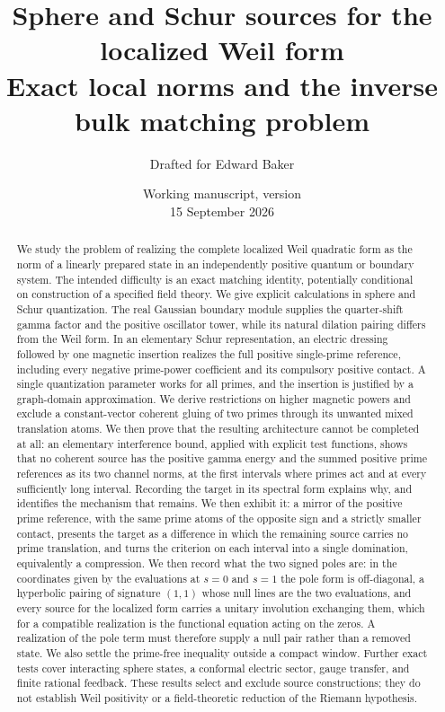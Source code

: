 \documentclass[11pt]{article}
\title{Sphere and Schur sources for the localized Weil form\\[5pt]
\large Exact local norms and the inverse bulk matching problem}
\author{Drafted for Edward Baker}
\date{Working manuscript, version \draftversion\\15 September 2026}
\numberwithin{equation}{section}
\theoremstyle{definition}
\theoremstyle{remark}
\begin{document}
\maketitle
\begin{abstract}
We study the problem of realizing the complete localized Weil quadratic
form as the norm of a linearly prepared state in an independently positive
quantum or boundary system. The intended difficulty is an exact matching
identity, potentially conditional on construction of a specified field
theory. We give explicit calculations in sphere and Schur quantization.
The real Gaussian boundary module supplies the quarter-shift gamma factor
and the positive oscillator tower, while its natural dilation pairing
differs from the Weil form. In an elementary Schur representation, an
electric dressing followed by one magnetic insertion realizes the full
positive single-prime reference, including every negative prime-power
coefficient and its compulsory positive contact. A single quantization
parameter works for all primes, and the insertion is justified by a
graph-domain approximation. We derive restrictions on higher magnetic
powers and exclude a constant-vector coherent gluing of two primes through
its unwanted mixed translation atoms. We then prove that the resulting
architecture cannot be completed at all: an elementary interference bound,
applied with explicit test functions, shows that no coherent source has the
positive gamma energy and the summed positive prime references as its two
channel norms, at the first intervals where primes act and at every
sufficiently long interval. Recording the target in its spectral form
explains why, and identifies the mechanism that remains. We then exhibit it:
a mirror of the positive prime reference, with the same prime atoms of the
opposite sign and a strictly smaller contact, presents the target as a
difference in which the remaining source carries no prime translation, and
turns the criterion on each interval into a single domination, equivalently a
compression. We then record what the two signed poles are: in the coordinates
given by the evaluations at $s=0$ and $s=1$ the pole form is off-diagonal, a
hyperbolic pairing of signature $(1,1)$ whose null lines are the two
evaluations, and every source for the localized form carries a unitary
involution exchanging them, which for a compatible realization is the
functional equation acting on the zeros. A realization of the pole term must
therefore supply a null pair rather than a removed state. We also settle the
prime-free inequality outside a compact window. Further exact tests
cover interacting sphere states, a conformal electric sector, gauge transfer,
and finite rational feedback. These results select and exclude source
constructions; they do not establish Weil positivity or a field-theoretic
reduction of the Riemann hypothesis.
\end{abstract}
\end{document}
